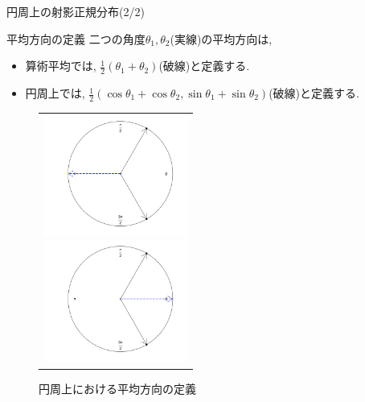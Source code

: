 \documentclass[dvipdfmx]{beamer} %
\begin{document}
\begin{frame}{円周上の射影正規分布(2/2)}
\begin{itembox}[l]{平均方向の定義}
二つの角度$\theta_1, \theta_2$(実線)の平均方向は,
\begin{itemize}
	\item
	算術平均では, $\frac{1}{2} (\theta_1 + \theta_2)$(破線)と定義する.
	
	\item 
	円周上では, $\frac{1}{2} (\cos \theta_1 + \cos \theta_2,\sin \theta_1 + \sin \theta_2)$(破線)と定義する.
\end{itemize}
\end{itembox}

\vspace{-0.3cm}
\begin{figure}[H]
 \begin{tabular}{c}
 \begin{minipage}{0.5\hsize}
  \begin{center}
   \includegraphics[clip,height= 40mm]{data/sample_False.png}
\caption{算術平均による平均の定義}
\label{sample_mu1}
  \end{center}
 \end{minipage}
 \hspace{-0.5cm}
 \begin{minipage}{0.5\hsize}
  \begin{center}
 \includegraphics[clip,height= 40mm]{data/sample_True.png}
\caption{円周上における平均方向の定義}
\label{sample_mu2}
  \end{center}
 \end{minipage}
\end{tabular}
\label{sample_mu}
\end{figure}
\end{frame}
\end{document}
